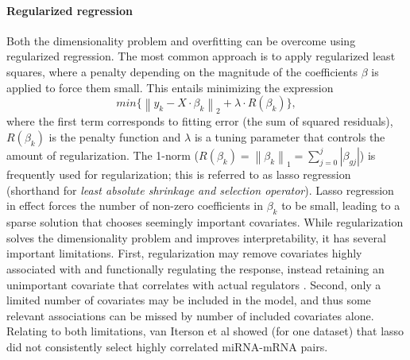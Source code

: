 \paragraph{Regularized regression}
Both the dimensionality problem and overfitting can be overcome using regularized
regression. The most common approach is to apply regularized least squares,
where a penalty depending on the magnitude of the coefficients $\beta$
is applied to force them small. This entails minimizing the expression
\begin{equation}
	min\{ \left \| y_k - X \cdot \beta_k \right \|_2 + \lambda \cdot R(\beta_k) \} ,
\end{equation}
where the first term corresponds to fitting error (the sum of squared residuals),
$R(\beta_k)$ is the penalty function and $\lambda$ is a tuning
parameter that controls the amount of regularization. 
The 1-norm ($R(\beta_k) = \left \| \beta_k \right \|_1 = \sum_{j=0}^{j} \left | \beta_{gj} \right |$)
is frequently used for regularization; this is referred to as lasso regression
(shorthand for \emph{least absolute shrinkage and selection operator}).
Lasso regression in effect forces the number of non-zero coefficients in $\beta_k$
to be small, leading to a sparse solution that chooses seemingly important covariates.
While regularization solves the dimensionality problem and improves
interpretability, it has several important limitations. First, regularization
may remove covariates highly associated with and functionally regulating the
response, instead retaining an unimportant covariate that correlates with
actual regulators \citep{Engelmann2012}. Second, only a limited number of
covariates may be included in the model, and thus some relevant associations
can be missed by number of included covariates alone.%
Relating to both limitations, van Iterson et al \citep{vanIterson2013} showed (for one dataset) that
lasso did not consistently select highly correlated miRNA-mRNA pairs.

